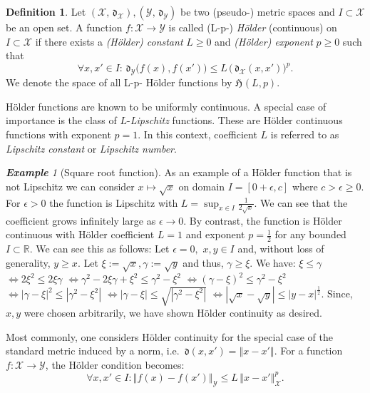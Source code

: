 \documentclass{article} %
\theoremstyle{definition}
\newtheorem{defn}[thm]{Definition}
\theoremstyle{remark}
\newtheorem{ex}[thm]{\textbf{Example}}
\newcommand{\norm}[1]{\left\Vert#1\right\Vert}
\newcommand{\abs}[1]{\left\vert#1\right\vert}
\newcommand{\Real}{\mathbb R}
\newcommand{\inspace}{\ensuremath{ \mathcal X}}
\newcommand{\outspace}{\ensuremath{ \mathcal Y}}
\newcommand{\metric}{\, \mathfrak{d}} %
\newcommand{\hoelset}[3]{\mathfrak{H}_{#2}(#1,#3)}
\begin{document}
\begin{defn} 
Let $(\inspace ,\metric_\inspace ), (\outspace , \metric_\outspace )$ be two (pseudo-) metric spaces and 
$I \subset \inspace$ be an open set. A function $f: \inspace \to \outspace $ is called (L-p-) \emph{H\"older} 
(continuous) on $I \subset \inspace$ if there exists a \emph{(H\"older) constant} $L \geq 0$ and \emph{(H\"older) 
exponent} $p\geq 0$ such that 
\[\forall x,x' \in I : \metric_\outspace \bigl(f(x),f(x')\bigr) \leq L \, \bigl( \metric_\inspace (x,x') \bigr)^p. \]
We denote the space of all L-p- H\"older functions by $\hoelset{L}{}{p}$.
\end{defn}

H\"older functions are known to be uniformly continuous. 
A special case of importance is the class of $L$-\textit{Lipschitz} functions. These are H\"older continuous 
functions with exponent $p=1$. In this context, coefficient $L$ is referred to as\textit{ Lipschitz constant} or \textit{Lipschitz number}.

\begin{ex}[Square root function]\label{ex:sqrtfctHoelder}
As an example of a H\"older function that is not Lipschitz we can consider $x \mapsto \sqrt x$ on domain $I = [0+\epsilon,c]$ where 
$c >\epsilon \geq 0 $. For $\epsilon >0 $ the function is Lipschitz with $L = \sup_{x \in I} \frac{1} {2 \sqrt{x}}$. We can see that the 
coefficient grows infinitely large as $\epsilon \to 0$. By contrast, the function is H\"older continuous 
with H\"older coefficient $L=1$ and exponent $p=\frac 1 2 $ for any bounded $I \subset \Real$.
We can see this as follows: Let $\epsilon =0,$ $x,y \in I$ and, without loss of generality,  $y \geq x$. Let $\xi := \sqrt{x}, \gamma := \sqrt{y}$ and thus, $\gamma \geq \xi$. We have:
$\xi \leq \gamma $ $\Leftrightarrow 2 \xi^2 \leq 2\xi\gamma$ $\Leftrightarrow \gamma^2 - 2 \xi\gamma + \xi^2  \leq \gamma^2 - \xi^2$ $\Leftrightarrow (\gamma-\xi)^2  \leq \gamma^2-\xi^2$ $\Leftrightarrow \abs{\gamma-\xi}^2  \leq \abs{\gamma^2-\xi^2}$
$\Leftrightarrow \abs{\gamma-\xi}  \leq \sqrt{\abs{\gamma^2-\xi^2}}$  $\Leftrightarrow \abs{\sqrt{x}-\sqrt{y}} \leq \abs{y-x}^{\frac{1}{2}}$. Since, $x,y$ were chosen arbitrarily, we have shown H\"older continuity as desired.
\end{ex}

Most commonly, one considers H\"older continuity for the special case of the standard metric induced by a norm, i.e.  $\metric(x,x') = \norm{x-x'}$.
For a function $f: \inspace \to \outspace$, the H\"older condition becomes:
\[\forall x,x' \in I : \norm{f(x)-f(x')}_\outspace \leq L \, \norm{x-x'}_\inspace^p. \]
\end{document}
